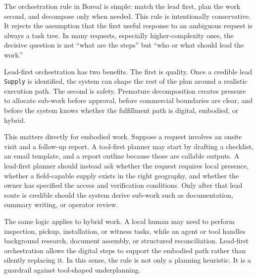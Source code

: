 The orchestration rule in Boreal is simple: match the lead first, plan the work second, and decompose only when needed. This rule is intentionally conservative. It rejects the assumption that the first useful response to an ambiguous request is always a task tree. In many requests, especially higher-complexity ones, the decisive question is not ``what are the steps'' but ``who or what should lead the work.''

Lead-first orchestration has two benefits. The first is quality. Once a credible lead \texttt{Supply} is identified, the system can shape the rest of the plan around a realistic execution path. The second is safety. Premature decomposition creates pressure to allocate sub-work before approval, before commercial boundaries are clear, and before the system knows whether the fulfillment path is digital, embodied, or hybrid.

This matters directly for embodied work. Suppose a request involves an onsite visit and a follow-up report. A tool-first planner may start by drafting a checklist, an email template, and a report outline because those are callable outputs. A lead-first planner should instead ask whether the request requires local presence, whether a field-capable supply exists in the right geography, and whether the owner has specified the access and verification conditions. Only after that lead route is credible should the system derive sub-work such as documentation, summary writing, or operator review.

The same logic applies to hybrid work. A local human may need to perform inspection, pickup, installation, or witness tasks, while an agent or tool handles background research, document assembly, or structured reconciliation. Lead-first orchestration allows the digital steps to support the embodied path rather than silently replacing it. In this sense, the rule is not only a planning heuristic. It is a guardrail against tool-shaped underplanning.
